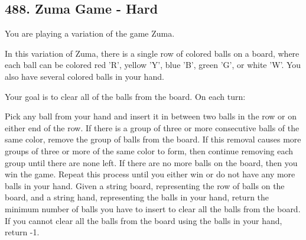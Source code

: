 \documentclass[9pt, b5paaper]{book}
\begin{document}
\subsection{488. Zuma Game - Hard}
\label{sec-1-0-9}
You are playing a variation of the game Zuma.

In this variation of Zuma, there is a single row of colored balls on a board, where each ball can be colored red 'R', yellow 'Y', blue 'B', green 'G', or white 'W'. You also have several colored balls in your hand.

Your goal is to clear all of the balls from the board. On each turn:

Pick any ball from your hand and insert it in between two balls in the row or on either end of the row.
If there is a group of three or more consecutive balls of the same color, remove the group of balls from the board.
If this removal causes more groups of three or more of the same color to form, then continue removing each group until there are none left.
If there are no more balls on the board, then you win the game.
Repeat this process until you either win or do not have any more balls in your hand.
Given a string board, representing the row of balls on the board, and a string hand, representing the balls in your hand, return the minimum number of balls you have to insert to clear all the balls from the board. If you cannot clear all the balls from the board using the balls in your hand, return -1.
\end{document}
